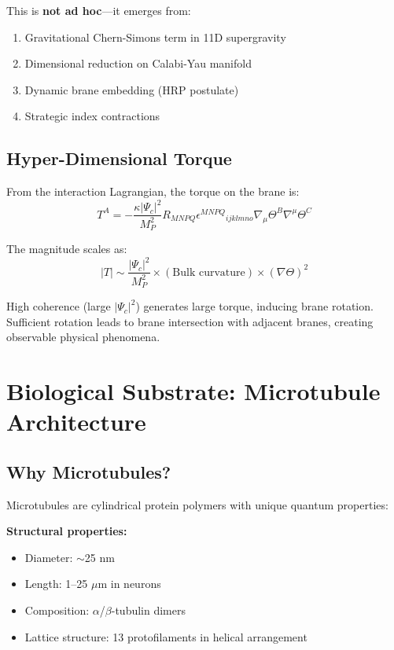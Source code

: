 This is \textbf{not ad hoc}---it emerges from:
\begin{enumerate}
\item Gravitational Chern-Simons term in 11D supergravity
\item Dimensional reduction on Calabi-Yau manifold
\item Dynamic brane embedding (HRP postulate)
\item Strategic index contractions
\end{enumerate}

\subsection{Hyper-Dimensional Torque}

From the interaction Lagrangian, the torque on the brane is:
\begin{equation}
T^A = -\frac{\kappa|\Psi_c|^2}{M_P^2}R_{MNPQ}\epsilon^{MNPQ}{}_{ijklmno}\nabla_\mu\Theta^B\nabla^\mu\Theta^C
\end{equation}

The magnitude scales as:
\begin{equation}
|T| \sim \frac{|\Psi_c|^2}{M_P^2} \times (\text{Bulk curvature}) \times (\nabla\Theta)^2
\end{equation}

\begin{keyconcept}
High coherence (large $|\Psi_c|^2$) generates large torque, inducing brane rotation. Sufficient rotation leads to brane intersection with adjacent branes, creating observable physical phenomena.
\end{keyconcept}

\section{Biological Substrate: Microtubule Architecture}

\subsection{Why Microtubules?}

Microtubules are cylindrical protein polymers with unique quantum properties:

\textbf{Structural properties:}
\begin{itemize}
\item Diameter: $\sim$25 nm
\item Length: 1--25 $\mu$m in neurons
\item Composition: $\alpha$/$\beta$-tubulin dimers
\item Lattice structure: 13 protofilaments in helical arrangement
\end{itemize}

